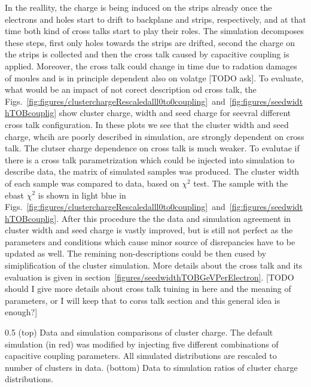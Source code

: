 In the reallity, the charge is being induced on the strips already once the electrons and holes start to drift to backplane and strips, respectively, and at that time both kind of cross talks start to play their roles. The simulation decomposes these steps, first only holes towards the strips are drifted, second the charge on the strips is collected and then the cross talk caused by capacitive coupling is applied. Moreover, the cross talk could change in time due to radation damages of moules and is in principle dependent also on volatge [TODO ask]. To evaluate, what would be an impact of not corect description od cross talk, the Figs.~\ref{fig:figures/clusterchargeRescaledalll0to0coupling}~and~\ref{fig:figures/seedwidthTOBcouplig} show cluster charge, width and seed charge for seevral different cross talk configuration. In these plots we see that the cluster width and seed charge, whcih are poorly described in simulation, are strongly dependent on cross talk. The clutser charge dependence on cross talk is much weaker. To evalutae if there is a cross talk parametrization which could be injected into simulation to describe data, the matrix of simulated samples was produced. The cluster width of each sample was compared to data, based on $\chi^{2}$ test. The sample with the ebast $\chi^{2}$ is shown in light blue in Figs.~\ref{fig:figures/clusterchargeRescaledalll0to0coupling}~and~\ref{fig:figures/seedwidthTOBcouplig}. After this procedure the the data and simulation agreement in cluster width and seed charge is vastly improved, but is still not perfect as the parameters and conditions which cause minor source of disrepancies have to be updated as well. The remining non-descriptions could be then cused by simiplification of the cluster simulation. More details about the cross talk and its evaluation is given in section~\ref{figures/seedwidthTOBGeVPerElectron}. [TODO should I give more details about cross talk tuining in here and the meaning of parameters, or I will keep that to corss talk section and this general idea is enough?]


                 {0.5}       %
                 { (top) Data and simulation comparisons of cluster charge. The default simulation (in red) was modified by injecting five different combinations of capacitive coupling parameters. All simulated distributions are rescaled to number of clusters in data. (bottom) Data to simulation ratios of cluster charge distributions. }


